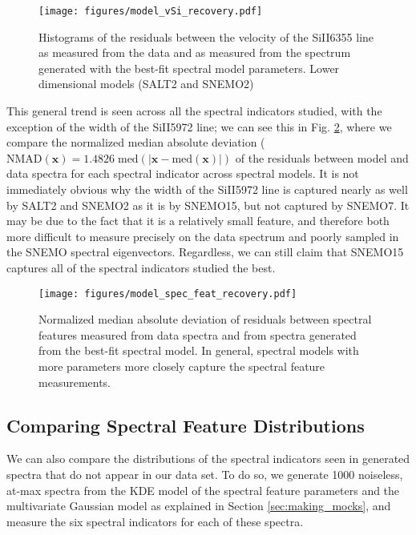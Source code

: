 \begin{figure}
    \centering
    \texttt{[image: figures/model\_vSi\_recovery.pdf]}
    \caption{Histograms of the residuals between the velocity of the SiII6355 line as measured from the data and as measured from the spectrum generated with the best-fit spectral model parameters. Lower dimensional models (SALT2 and SNEMO2) }
    \label{fig:model_vSi_recovery}
\end{figure}

This general trend is seen across all the spectral indicators studied, with the exception of the width of the SiII5972 line; we can see this in Fig. \ref{fig:model_spec_feat_recovery}, where we compare the normalized median absolute deviation ($\text{NMAD}(\bm{x})=1.4826\;\text{med}(|\bm{x}-\text{med}(\bm{x})|)$ of the residuals between model and data spectra for each spectral indicator across spectral models. It is not immediately obvious why the width of the SiII5972 line is captured nearly as well by SALT2 and SNEMO2 as it is by SNEMO15, but not captured by SNEMO7. It may be due to the fact that it is a relatively small feature, and therefore both more difficult to measure precisely on the data spectrum and poorly sampled in the SNEMO spectral eigenvectors. Regardless, we can still claim that SNEMO15 captures all of the spectral indicators studied the best.

\begin{figure}
    \centering
    \texttt{[image: figures/model\_spec\_feat\_recovery.pdf]}
    \caption{Normalized median absolute deviation of residuals between spectral features measured from data spectra and from spectra generated from the best-fit spectral model. In general, spectral models with more parameters more closely capture the spectral feature measurements.}
    \label{fig:model_spec_feat_recovery}
\end{figure}

\subsection{Comparing Spectral Feature Distributions}
We can also compare the distributions of the spectral indicators seen in generated spectra that do not appear in our data set. To do so, we generate 1000 noiseless, at-max spectra from the KDE model of the spectral feature parameters and the multivariate Gaussian model as explained in Section \ref{sec:making_mocks}, and measure the six spectral indicators for each of these spectra.

